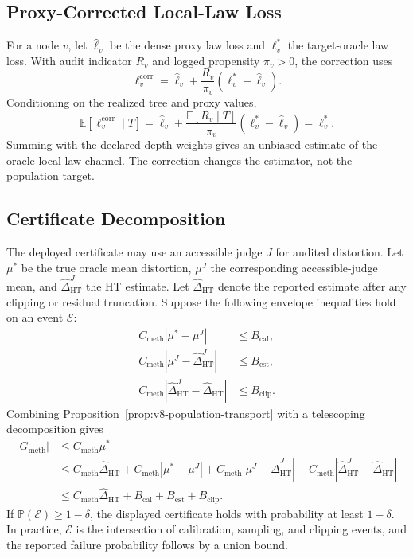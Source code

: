 \subsection{Proxy-Corrected Local-Law Loss}

For a node \(v\), let \(\widehat \ell_v\) be the dense proxy law loss and
\(\ell_v^\ast\) the target-oracle law loss. With audit indicator \(R_v\) and
logged propensity \(\pi_v>0\), the correction uses
\[
  \ell_v^{\mathrm{corr}}
  =
  \widehat\ell_v
  +
  \frac{R_v}{\pi_v}
  (\ell_v^\ast-\widehat\ell_v).
\]
Conditioning on the realized tree and proxy values,
\[
\mathbb E[\ell_v^{\mathrm{corr}}\mid T]
=
\widehat\ell_v
+
\frac{\mathbb E[R_v\mid T]}{\pi_v}
(\ell_v^\ast-\widehat\ell_v)
=
\ell_v^\ast .
\]
Summing with the declared depth weights gives an unbiased estimate of the
oracle local-law channel. The correction changes the estimator, not the
population target.

\subsection{Certificate Decomposition}

The deployed certificate may use an accessible judge \(J\) for audited
distortion. Let \(\mu^\ast\) be the true oracle mean distortion,
\(\mu^J\) the corresponding accessible-judge mean, and
\(\widehat\Delta_{\mathrm{HT}}^J\) the HT estimate. Let
\(\widehat\Delta_{\mathrm{HT}}\) denote the reported estimate after any
clipping or residual truncation. Suppose the following envelope inequalities
hold on an event \(\mathcal E\):
\[
\begin{aligned}
C_{\mathrm{meth}}|\mu^\ast-\mu^J| &\le B_{\mathrm{cal}},\\
C_{\mathrm{meth}}|\mu^J-\widehat\Delta_{\mathrm{HT}}^J|
&\le B_{\mathrm{est}},\\
C_{\mathrm{meth}}|\widehat\Delta_{\mathrm{HT}}^J
-\widehat\Delta_{\mathrm{HT}}|
&\le B_{\mathrm{clip}} .
\end{aligned}
\]
Combining Proposition~\ref{prop:v8-population-transport} with a telescoping
decomposition gives
\[
\begin{aligned}
|G_{\mathrm{meth}}|
&\le C_{\mathrm{meth}}\mu^\ast\\
&\le
C_{\mathrm{meth}}\widehat\Delta_{\mathrm{HT}}
+
C_{\mathrm{meth}}|\mu^\ast-\mu^J|
+
C_{\mathrm{meth}}|\mu^J-\widehat\Delta_{\mathrm{HT}}^J|
+
C_{\mathrm{meth}}|\widehat\Delta_{\mathrm{HT}}^J
-\widehat\Delta_{\mathrm{HT}}|\\
&\le
C_{\mathrm{meth}}\widehat\Delta_{\mathrm{HT}}
+
B_{\mathrm{cal}}
+
B_{\mathrm{est}}
+
B_{\mathrm{clip}} .
\end{aligned}
\]
If \(\mathbb P(\mathcal E)\ge 1-\delta\), the displayed certificate holds
with probability at least \(1-\delta\). In practice, \(\mathcal E\) is the
intersection of calibration, sampling, and clipping events, and the reported
failure probability follows by a union bound.

